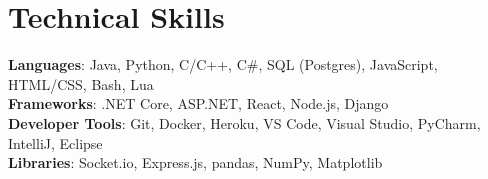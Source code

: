 \documentclass[letterpaper,12pt]{article}
\begin{document}
%
\section{Technical Skills}
 \begin{itemize}[leftmargin=0.15in, label={}]
    \small{\item{
     \textbf{Languages}{: Java, Python, C/C++, C\#, SQL (Postgres), JavaScript, HTML/CSS, Bash, Lua} \\
     \textbf{Frameworks}{: .NET Core, ASP.NET, React, Node.js, Django} \\
     \textbf{Developer Tools}{: Git, Docker, Heroku, VS Code, Visual Studio, PyCharm, IntelliJ, Eclipse} \\
     \textbf{Libraries}{: Socket.io, Express.js, pandas, NumPy, Matplotlib}
    }}
 \end{itemize}


\end{document}
